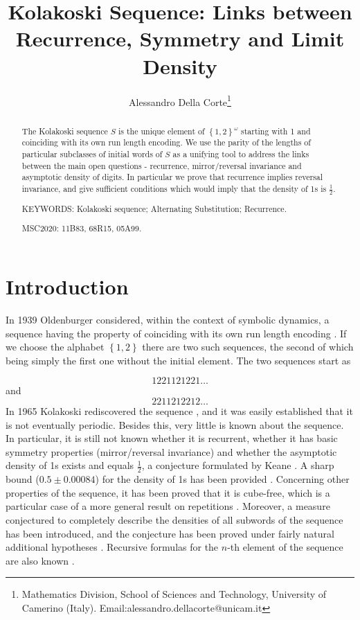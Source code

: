 \documentclass[10pt,a4paper]{article}
\title{Kolakoski Sequence: Links between Recurrence, Symmetry and Limit Density}
\author{Alessandro Della Corte\footnote{Mathematics Division, School of Sciences and Technology, University of Camerino (Italy). Email:alessandro.dellacorte@unicam.it}}
\begin{document}
\setlength{\parindent}{0pt}
\maketitle
\begin{abstract}
The Kolakoski sequence $S$ is the unique element of $\left\lbrace 1,2 \right\rbrace^{\omega}$ starting with 1 and coinciding with its own run length encoding. We use the parity of the lengths of particular subclasses of initial words of $S$ as a unifying tool to address the links between the main open questions - recurrence, mirror/reversal invariance and asymptotic density of digits.  In particular we prove that recurrence implies reversal invariance, and give sufficient conditions which would imply that the density of 1s is $\frac{1}{2}$. 
 
 KEYWORDS: Kolakoski sequence; Alternating Substitution; Recurrence.  

MSC2020: 11B83, 68R15, 05A99.

\end{abstract}
\section{Introduction}
In 1939 Oldenburger considered, within the context of symbolic dynamics, a sequence having the property of coinciding with its own run length encoding  \cite{oldenburger1939exponent}. If we choose  the alphabet $\left\lbrace 1,2 \right\rbrace$ there are two such sequences, the second of which being simply the first one without the initial element. The two sequences start as

$$1221121221\ldots$$ and $$2211212212\ldots$$
In 1965 Kolakoski rediscovered the sequence \cite{kolakoski1965problem}, and it was easily established that it is not eventually periodic. Besides this, very little is known about the sequence. In particular, it is still not known whether it is recurrent, whether it has basic symmetry properties (mirror/reversal invariance) and whether the asymptotic density of 1s exists and equals $\frac{1}{2}$, a conjecture formulated by Keane \cite{keane1991ergodic}. A sharp bound ($0.5 \pm 0.00084$) for the density of 1s has been provided  \cite{chvatal1994notes}. Concerning other properties of the sequence, it has been proved that it is cube-free, which is a particular case of a more general result on repetitions \cite{carpi1994repeated}. Moreover, a measure conjectured to completely describe the densities of all subwords of the sequence has been introduced, and the conjecture has been proved under fairly natural additional hypotheses \cite{dekking1997long}. Recursive formulas for the $n$-th element of the sequence are also known \cite{steinsky2006recursive,hammam2016some}.
\end{document}
